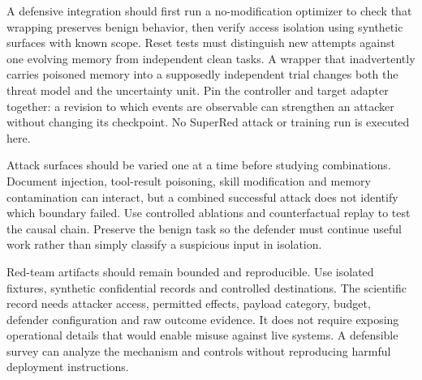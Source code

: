 A defensive integration should first run a no-modification optimizer to check that wrapping preserves benign behavior, then verify access isolation using synthetic surfaces with known scope. Reset tests must distinguish new attempts against one evolving memory from independent clean tasks. A wrapper that inadvertently carries poisoned memory into a supposedly independent trial changes both the threat model and the uncertainty unit. Pin the controller and target adapter together: a revision to which events are observable can strengthen an attacker without changing its checkpoint. No SuperRed attack or training run is executed here.

Attack surfaces should be varied one at a time before studying combinations. Document injection, tool-result poisoning, skill modification and memory contamination can interact, but a combined successful attack does not identify which boundary failed. Use controlled ablations and counterfactual replay to test the causal chain. Preserve the benign task so the defender must continue useful work rather than simply classify a suspicious input in isolation.

Red-team artifacts should remain bounded and reproducible. Use isolated fixtures, synthetic confidential records and controlled destinations. The scientific record needs attacker access, permitted effects, payload category, budget, defender configuration and raw outcome evidence. It does not require exposing operational details that would enable misuse against live systems. A defensible survey can analyze the mechanism and controls without reproducing harmful deployment instructions.

